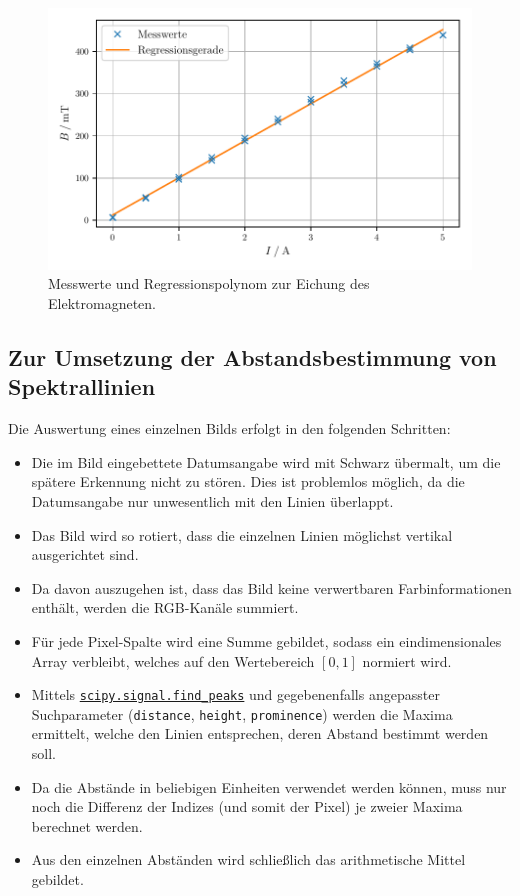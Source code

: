 \begin{figure}[H]
    \centering
    \includegraphics[width=\textwidth]{build/plt/1_magnet.pdf}
    \caption{Messwerte und Regressionspolynom zur Eichung des Elektromagneten.}
    \label{fig:plt:eichung}
\end{figure}

\subsection{Zur Umsetzung der Abstandsbestimmung von Spektrallinien}
Die Auswertung eines einzelnen Bilds erfolgt in den folgenden Schritten:
\begin{itemize}
    \item Die im Bild eingebettete Datumsangabe wird mit Schwarz übermalt, um die spätere Erkennung nicht zu stören.
          Dies ist problemlos möglich, da die Datumsangabe nur unwesentlich mit den Linien überlappt.
    \item Das Bild wird so rotiert, dass die einzelnen Linien möglichst vertikal ausgerichtet sind.
    \item Da davon auszugehen ist, dass das Bild keine verwertbaren Farbinformationen enthält, werden die RGB-Kanäle summiert.
    \item Für jede Pixel-Spalte wird eine Summe gebildet, sodass ein eindimensionales Array verbleibt,
          welches auf den Wertebereich $[0, 1]$ normiert wird.
    \item Mittels \href{https://docs.scipy.org/doc/scipy/reference/generated/scipy.signal.find_peaks.html}{\texttt{scipy.signal.find\_peaks}}
          und gegebenenfalls angepasster Suchparameter (\texttt{distance}, \texttt{height}, \texttt{prominence})
          werden die Maxima ermittelt,
          welche den Linien entsprechen, deren Abstand bestimmt werden soll.
    \item Da die Abstände in beliebigen Einheiten verwendet werden können,
          muss nur noch die Differenz der Indizes (und somit der Pixel) je zweier Maxima berechnet werden.
    \item Aus den einzelnen Abständen wird schließlich das arithmetische Mittel gebildet.
\end{itemize}

